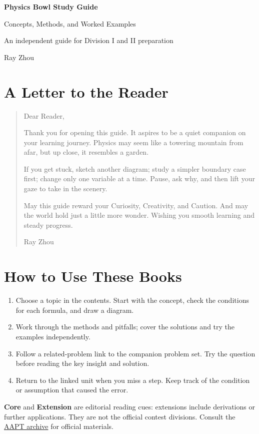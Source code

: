 \documentclass[12pt,a4paper]{article}
\begin{document}
\hypersetup{pageanchor=false}
\begin{titlepage}
\thispagestyle{empty}
\centering
\vspace*{2.2cm}
{\Huge\bfseries Physics Bowl Study Guide\par}
\vspace{0.7cm}
{\Large Concepts, Methods, and Worked Examples\par}
\vspace{0.5cm}
{\large An independent guide for Division I and II preparation\par}
\vfill
{\large Ray Zhou\par}
\end{titlepage}
\hypersetup{pageanchor=true}
\pagestyle{plain}

\section*{A Letter to the Reader}
\begin{quote}\raggedright
Dear Reader,\par\smallskip
Thank you for opening this guide. It aspires to be a quiet companion on your learning journey. Physics may seem like a towering mountain from afar, but up close, it resembles a garden.\par\medskip
If you get stuck, sketch another diagram; study a simpler boundary case first; change only one variable at a time. Pause, ask why, and then lift your gaze to take in the scenery.\par\medskip
May this guide reward your Curiosity, Creativity, and Caution. And may the world hold just a little more wonder. Wishing you smooth learning and steady progress.
\begin{flushright}Ray Zhou\end{flushright}
\end{quote}

\section*{How to Use These Books}
\begin{enumerate}[leftmargin=*]
  \item Choose a topic in the contents. Start with the concept, check the conditions for each formula, and draw a diagram.
  \item Work through the methods and pitfalls; cover the solutions and try the examples independently.
  \item Follow a related-problem link to the companion problem set. Try the question before reading the key insight and solution.
  \item Return to the linked unit when you miss a step. Keep track of the condition or assumption that caused the error.
\end{enumerate}
\noindent\textbf{Core} and \textbf{Extension} are editorial reading cues: extensions include derivations or further applications. They are not the official contest divisions. Consult the \href{https://www.aapt.org/Programs/PhysicsBowl/printexams.cfm}{AAPT archive} for official materials.
\end{document}
